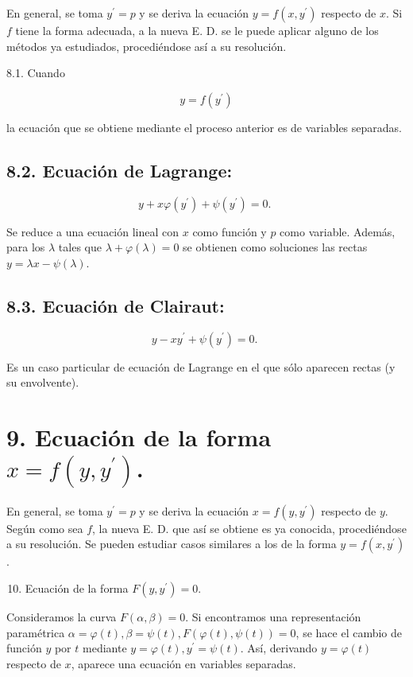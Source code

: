 \documentclass[10pt]{article}
\begin{document}
En general, se toma $y^{\prime}=p$ y se deriva la ecuación $y=f\left(x, y^{\prime}\right)$ respecto de $x$. Si $f$ tiene la forma adecuada, a la nueva E. D. se le puede aplicar alguno de los métodos ya estudiados, procediéndose así a su resolución.

8.1. Cuando

$$
y=f\left(y^{\prime}\right)
$$

la ecuación que se obtiene mediante el proceso anterior es de variables separadas.

\subsection*{8.2. Ecuación de Lagrange:}
$$
y+x \varphi\left(y^{\prime}\right)+\psi\left(y^{\prime}\right)=0 \text {. }
$$

Se reduce a una ecuación lineal con $x$ como función y $p$ como variable. Además, para los $\lambda$ tales que $\lambda+\varphi(\lambda)=0$ se obtienen como soluciones las rectas $y=\lambda x-\psi(\lambda)$.

\subsection*{8.3. Ecuación de Clairaut:}
$$
y-x y^{\prime}+\psi\left(y^{\prime}\right)=0 \text {. }
$$

Es un caso particular de ecuación de Lagrange en el que sólo aparecen rectas (y su envolvente).

\section*{9. Ecuación de la forma $x=f\left(y, y^{\prime}\right)$.}
En general, se toma $y^{\prime}=p$ y se deriva la ecuación $x=f\left(y, y^{\prime}\right)$ respecto de $y$. Según como sea $f$, la nueva E. D. que así se obtiene es ya conocida, procediéndose a su resolución. Se pueden estudiar casos similares a los de la forma $y=f\left(x, y^{\prime}\right)$.

\begin{enumerate}
  \setcounter{enumi}{9}
  \item Ecuación de la forma $F\left(y, y^{\prime}\right)=0$.
\end{enumerate}

Consideramos la curva $F(\alpha, \beta)=0$. Si encontramos una representación paramétrica $\alpha=\varphi(t), \beta=\psi(t), F(\varphi(t), \psi(t))=0$, se hace el cambio de función $y$ por $t$ mediante $y=\varphi(t), y^{\prime}=\psi(t)$. Así, derivando $y=\varphi(t)$ respecto de $x$, aparece una ecuación en variables separadas.
\end{document}
